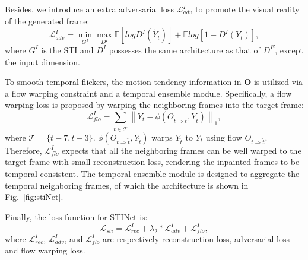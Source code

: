 Besides, we introduce an extra adversarial loss $\mathcal{L}^I_{adv}$ to promote the visual reality of the generated frame:
\begin{equation}
	\label{eq:inp_adver}
	\mathcal{L}^I_{adv}=\min\limits_{G^I} \max \limits_{D^I}\mathbb{E}[logD^I(\widetilde{Y}_t)]+\mathbb{E}log[1-D^I(Y_{t})],
\end{equation}
where $G^I$ is the STI and $D^I$ possesses the same architecture as that of $D^E$, except the input dimension.%





To smooth temporal flickers, the motion tendency information in $\boldsymbol{O}$ is utilized via a flow warping constraint and a temporal ensemble module.
Specifically, a flow warping loss is proposed by warping the neighboring frames into the target frame:
\begin{equation}
	\label{eq:inp_flow}
	\mathcal{L}^I_{flo}=\sum_{\widehat{t}\in\mathcal{T}}\left\| Y_t-\phi(O_{t\Rightarrow \widehat{t}},Y_{\widehat{t}}) \right\|_1,
\end{equation}
where $\mathcal{T}=\{t-7,t-3\}$. $\phi(O_{t\Rightarrow \widehat{t}},Y_{\widehat{t}})$ warps $Y_{\widehat{t}}$ to $Y_{t}$ using flow $O_{t\Rightarrow \widehat{t}}$.
Therefore, $\mathcal{L}^I_{flo}$ expects that all the neighboring frames can be well warped to the target frame with small reconstruction loss, rendering the inpainted frames to be temporal consistent.
The temporal ensemble module is designed to aggregate the temporal neighboring frames, of which the architecture is shown in Fig.~\ref{fig:stiNet}.


Finally, the loss function for STINet is:
\begin{equation}
	\label{eq:inpain_all}
	\mathcal{L}_{sti}=\mathcal{L}^{I}_{rec}+\lambda_2 * \mathcal{L}^I_{adv}+ \mathcal{L}^I_{flo},
\end{equation}
where $\mathcal{L}^{I}_{rec}$, $\mathcal{L}^I_{adv}$, and $\mathcal{L}^I_{flo}$ are respectively reconstruction loss, adversarial loss and flow warping loss.

